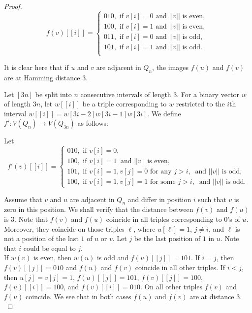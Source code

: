 \documentclass[10pt,a4paper]{amsart}
\begin{document}
\begin{proof}
\begin{equation}\nonumber
f(v)[[i]] = \begin{cases}
010,  \mbox{ if }  v[i]=0  \mbox{ and  }  ||v|| \mbox{ is even, }  \\
100,  \mbox{ if }  v[i]=1  \mbox{ and  }  ||v|| \mbox{ is even, }  \\
011,  \mbox{ if }  v[i]=0  \mbox{ and  }  ||v|| \mbox{ is odd, }  \\
101,  \mbox{ if }  v[i]=1  \mbox{ and  }  ||v|| \mbox{ is odd. }  \\
\end{cases}
\end{equation}

It is clear here that if $u$ and $v$ are adjacent in $Q_n$, the images $f(u)$ and $f(v)$ are at Hamming distance $3$.
		
	
\vskip 1cm	

Let $[3n]$ be split into $n$ consecutive intervals of length $3$.  For a binary vector $w$ of length $3n$, let $w[[i]]$ be a triple corresponding to $w$ restricted to the $i$th interval  $w[[i]]= w[3i-2] w[3i-1] w[3i]$.  We define $f':V(Q_n)\rightarrow V(Q_{3n})$ as follows:


Let 
\begin{equation} \nonumber
f'(v)[[i]] = \begin{cases}
010,  \mbox{ if }  v[i]=0, \\
100,  \mbox{ if }  v[i]=1 ~ \mbox{ and   } ||v|| \mbox{ is even}, \\
101,  \mbox{ if }  v[i]=1,  v[j]=0 \mbox{ for any } j>i, ~ \mbox{ and   } ||v|| \mbox{ is odd},\\
100,  \mbox{ if }  v[i]=1,  v[j]=1 \mbox{ for some } j>i, ~ \mbox{ and   } ||v|| \mbox{ is odd}.
\end{cases}
\end{equation}		
		
Assume that $v$ and $u$ are adjacent in $Q_n$ and differ in position $i$ such that $v$ is zero in this position.
We shall verify that the distance between $f(v)$ and $f(u)$ is $3$.
Note that $f(v)$ and $f(u)$ coincide in all triples corresponding to $0$'s of $u$. Moreover, they coincide on those triples $\ell$, where $u[\ell]=1$, $j\neq i$, and $\ell$ is not a position of the last $1$ of $u$ or $v$.  Let $j$ be the last position of $1$ in $u$. Note that $i$ could be equal to $j$.  \\

If $w(v)$ is even, then $w(u)$ is odd and $f(u)[[j]]=101$. If $i=j$, then $f(v)[[j]]=010$ and $f(u)$ and $f(v)$ coincide in all other triples.  If $i<j$,  then $u[j]=v[j] =1$, $f(u)[[j]]=101$, $f(v)[[j]]=100$, 
$f(u)[[i]]=100$, and $f(v)[[i]]=010$. On all other triples $f(v)$ and $f(u)$ coincide. We see that in both cases $f(u)$ and $f(v)$ are at distance $3$.\\


\end{proof}
\end{document}
